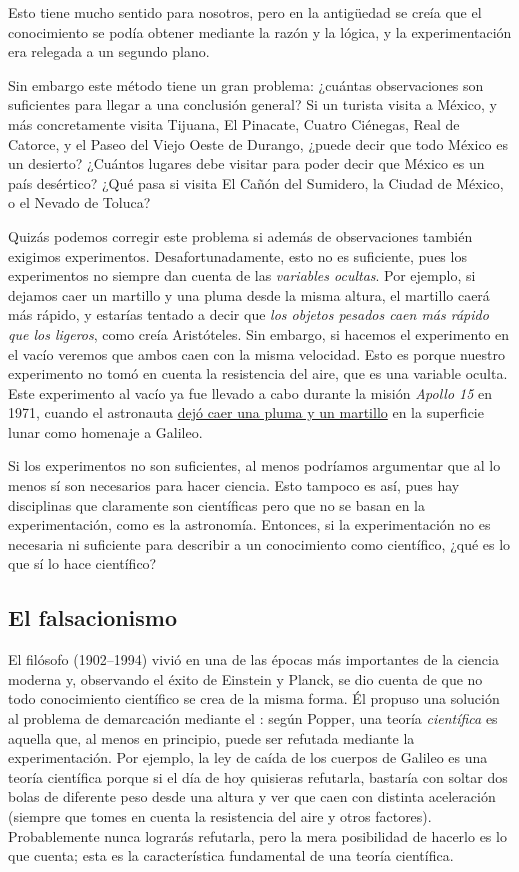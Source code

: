 Esto tiene mucho sentido para nosotros, pero en la antigüedad se creía que el conocimiento se podía obtener mediante la razón y la lógica, y la experimentación era relegada a un segundo plano.

Sin embargo este método tiene un gran problema: ¿cuántas observaciones son suficientes para llegar a una conclusión general?
Si un turista visita a México, y más concretamente visita Tijuana, El Pinacate, Cuatro Ciénegas, Real de Catorce, y el Paseo del Viejo Oeste de Durango, ¿puede decir que todo México es un desierto?
¿Cuántos lugares debe visitar para poder decir que México es un país desértico?
¿Qué pasa si visita El Cañón del Sumidero, la Ciudad de México, o el Nevado de Toluca?

Quizás podemos corregir este problema si además de observaciones también exigimos experimentos.
Desafortunadamente, esto no es suficiente, pues los experimentos no siempre dan cuenta de las \emph{variables ocultas}.
Por ejemplo, si dejamos caer un martillo y una pluma desde la misma altura, el martillo caerá más rápido, y estarías tentado a decir que \emph{los objetos pesados caen más rápido que los ligeros}, como creía Aristóteles.
Sin embargo, si hacemos el experimento en el vacío veremos que ambos caen con la misma velocidad.
Esto es porque nuestro experimento no tomó en cuenta la resistencia del aire, que es una variable oculta.
Este experimento al vacío ya fue llevado a cabo durante la misión \emph{Apollo 15} en 1971, cuando el astronauta  \href{https://youtu.be/Oo8TaPVsn9Y}{ dejó caer una pluma y un martillo} en la superficie lunar como homenaje a Galileo.

Si los experimentos no son suficientes, al menos podríamos argumentar que al lo menos sí son necesarios para hacer ciencia.
Esto tampoco es así, pues hay disciplinas que claramente son científicas pero que no se basan en la experimentación, como es la astronomía.
Entonces, si la experimentación no es necesaria ni suficiente para describir a un conocimiento como científico, ¿qué es lo que sí lo hace científico?

\subsection*{El falsacionismo}
\label{sub:elfalsacionismo}
El filósofo  (1902--1994) vivió en una de las épocas más importantes de la ciencia moderna y, observando el éxito de Einstein y Planck, se dio cuenta de que no todo conocimiento científico se crea de la misma forma.
Él propuso una solución al problema de demarcación mediante el \cite{Popper1959}: según Popper, una teoría \emph{científica} es aquella que, al menos en principio, puede ser refutada mediante la experimentación.
Por ejemplo, la ley de caída de los cuerpos de Galileo es una teoría científica porque si el día de hoy quisieras refutarla, bastaría con soltar dos bolas de diferente peso desde una altura y ver que caen con distinta aceleración (siempre que tomes en cuenta la resistencia del aire y otros factores).
Probablemente nunca lograrás refutarla, pero la mera posibilidad de hacerlo es lo que cuenta; esta es la característica fundamental de una teoría científica.

